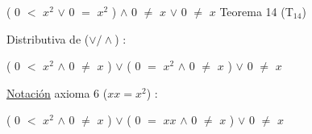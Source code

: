\documentclass[12pt]{article}
\begin{document}
(\hspace{0.2cm} $0$ $<$ $x^{2}$ \hspace{0.2cm} $\vee$ \hspace{0.2cm} $0$ $=$ $x^{2}$ \hspace{0.2cm}) \hspace{0.2cm} $\wedge$ \hspace{0.2cm} $0$ $\neq$ $x$ \hspace{0.2cm} $\vee$ \hspace{0.2cm} $0$ $\neq$ $x$ \hspace{.1cm} {\textcolor{carrotorange}{Teorema 14  (T$_{14}$)}} \vspace{0.5cm}

{\textcolor{carrotorange}{Distributiva de {\Large{($\vee / \wedge$) :}}}} \vspace{0.5cm}

(\hspace{0.2cm} $0$ $<$ $x^{2}$ \hspace{0.2cm} $\wedge$ \hspace{0.2cm} $0$ $\neq$ $x$ \hspace{0.2cm}) \hspace{0.2cm} $\vee$ \hspace{0.2cm} (\hspace{0.2cm} $0$ $=$ $x^{2}$ \hspace{0.2cm} $\wedge$ \hspace{0.2cm} $0$ $\neq$ $x$ \hspace{0.2cm}) \hspace{0.2cm} $\vee$ \hspace{0.2cm} $0$ $\neq$ $x$ \vspace{0.5cm}


{\textcolor{carrotorange}{{\underline{Notación}} axioma 6 ($xx=x^{2}$) :}} \vspace{0.5cm}

(\hspace{0.2cm} $0$ $<$ $x^{2}$ \hspace{0.2cm} $\wedge$ \hspace{0.2cm} $0$ $\neq$ $x$ \hspace{0.2cm}) \hspace{0.2cm} $\vee$ \hspace{0.2cm} (\hspace{0.2cm} $0$ $=$ $xx$ \hspace{0.2cm} $\wedge$ \hspace{0.2cm} $0$ $\neq$ $x$ \hspace{0.2cm}) \hspace{0.2cm} $\vee$ \hspace{0.2cm} $0$ $\neq$ $x$ \vspace{0.5cm}
\end{document}
